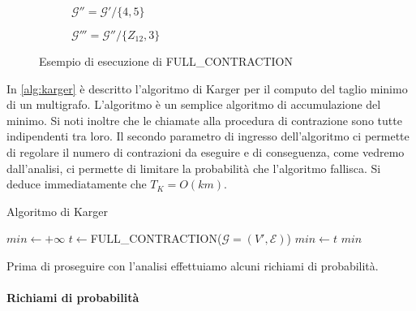 \begin{figure}
\begin{subfigure}{.5\textwidth}
	\label{fig:fullcontractionc}
	\caption{$\mathcal{G''}=\mathcal{G'}/\{4,5\}$}
\end{subfigure}
\begin{subfigure}{.5\textwidth}
	\centering
	\label{fig:fullcontractiond}
	\caption{$\mathcal{G'''}=\mathcal{G''}/\{Z_{12},3\}$}
\end{subfigure}
\caption{Esempio di esecuzione di FULL\_CONTRACTION}
\label{fig:fullcontraction}
\end{figure}

In \ref{alg:karger} è descritto l'algoritmo di Karger per il computo del taglio minimo di un multigrafo. L'algoritmo è un semplice algoritmo di accumulazione del minimo. Si noti inoltre che le chiamate alla procedura di contrazione sono tutte indipendenti tra loro. Il secondo parametro di ingresso dell'algoritmo ci permette di regolare il numero di contrazioni da eseguire e di conseguenza, come vedremo dall'analisi, ci permette di limitare la probabilità che l'algoritmo fallisca. Si deduce immediatamente che $T_K=O(km)$.

\begin{algorithm}
\caption{Algoritmo di Karger}
\label{alg:karger}
\begin{algorithmic}
	\State $min \gets +\infty$
		\State $t \gets$FULL\_CONTRACTION($\mathcal{G}=(V',\mathcal{E})$)
			\State $min \gets t$
		\EndIf
	\EndFor
	\State \Return $min$
\EndFunction
\end{algorithmic}
\end{algorithm}

Prima di proseguire con l'analisi effettuiamo alcuni richiami di probabilità.

\paragraph{Richiami di probabilità}

